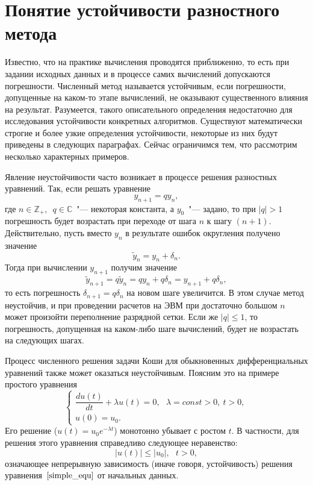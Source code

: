 \documentclass[11pt,a4paper,twoside]{report}
\numberwithin{equation}{section}
\theoremstyle{definition}
\theoremstyle{plain}
\begin{document}
\section{Понятие устойчивости разностного метода}
%
Известно, что на практике вычисления проводятся приближенно, то есть при
задании исходных данных и в процессе самих вычислений допускаются погрешности.
Численный метод называется устойчивым, если погрешности, допущенные на каком-то
 этапе вычислений, не оказывают существенного влияния на результат. Разумеется,
 такого описательного определения недостаточно для исследования устойчивости
 конкретных алгоритмов. Существуют математически строгие и более узкие
 определения устойчивости, некоторые из них будут приведены в следующих
 параграфах. Сейчас ограничимся тем, что рассмотрим несколько характерных
 примеров.

 Явление неустойчивости часто возникает в процессе решения разностных уравнений.
 Так, если решать уравнение
%
$$
    y_{n+1}=qy_n,
$$
%
где $n \in \mathbb{Z}_+,$~$q \in \mathbb{C}$~"--- некоторая константа, а $y_0$~"---
задано, то при
$|q| > 1$ погрешность будет возрастать при переходе от шага $n$ к шагу $(n+1)$.
Действительно, пусть вместо $y_n$ в результате ошибок округления получено
значение
%
$$
    \widetilde{y}_n = y_n+\delta_n.
$$
%
Тогда при вычислении $y_{n+1}$ получим значение
%
$$
    \widetilde{y}_{n+1} = q\widetilde{y}_n = qy_n+q\delta_n =
    y_{n+1} + q\delta_n,
$$
%
то есть погрешность $\delta_{n+1}=q\delta_n$ на новом шаге увеличится.
В этом случае метод неустойчив, и при проведении расчетов на ЭВМ при
достаточно большом $n$ может произойти переполнение разрядной сетки.
Если же $|q| \leqslant 1$, то погрешность, допущенная на каком-либо шаге
вычислений, будет не возрастать на следующих шагах.

Процесс численного решения задачи Коши для обыкновенных дифференциальных
уравнений также может оказаться неустойчивым.
Поясним это на примере простого уравнения
%
\begin{equation}
%
    \label{simple_equ}
    \begin{cases}
        \dfrac{du(t)}{dt}+\lambda u(t) = 0,~~~\lambda=const>0,~t>0,\\
        u(0)=u_0.
    \end{cases}
%
\end{equation}
%
Его решение ($u(t) = u_0e^{-\lambda t}$) монотонно убывает с ростом $t$. В частности,
для решения этого уравнения справедливо следующее неравенство:
%
\begin{equation}
%
    \label{simple1}
    |u(t)| \leqslant |u_0|,~~~t>0,
%
\end{equation}
%
означающее непрерывную зависимость (иначе говоря, устойчивость) решения
уравнения~$\eqref{simple_equ}$ от начальных данных.
\end{document}

